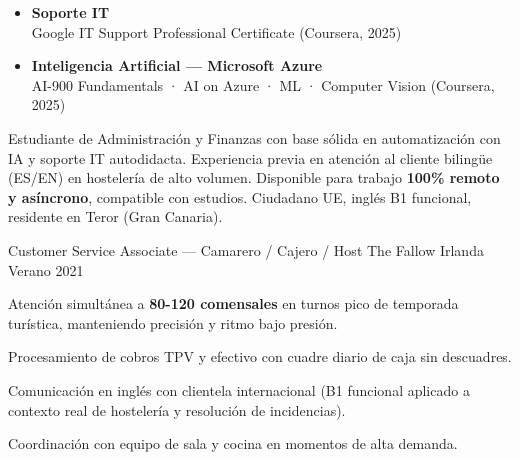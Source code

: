 \documentclass[10pt, a4paper]{awesome-cv}
\begin{document}
\begin{minipage}[t]{0.32\textwidth}
\begin{itemize}[leftmargin=*, label={}, itemsep=4pt]
\item \textbf{Soporte IT}\\{\footnotesize\color{graytext}Google IT Support Professional Certificate (Coursera, 2025) }
\item \textbf{Inteligencia Artificial — Microsoft Azure}\\{\footnotesize\color{graytext}AI-900 Fundamentals · AI on Azure · ML · Computer Vision (Coursera, 2025) }
\end{itemize}


\end{minipage}%
\hfill
\begin{minipage}[t]{0.66\textwidth}
\vspace{0pt}



\begin{cvparagraph}
Estudiante de Administración y Finanzas con base sólida en automatización con IA y soporte IT autodidacta. Experiencia previa en atención al cliente bilingüe (ES/EN) en hostelería de alto volumen. Disponible para trabajo \textbf{100\% remoto y asíncrono}, compatible con estudios. Ciudadano UE, inglés B1 funcional, residente en Teror (Gran Canaria).
\end{cvparagraph}



\begin{cventries}
\cventry
  { Customer Service Associate — Camarero / Cajero / Host }
  { The Fallow }
  { Irlanda }
  { Verano 2021 }
  {
\begin{cvitems}
    \item { Atención simultánea a \textbf{80-120 comensales} en turnos pico de temporada turística, manteniendo precisión y ritmo bajo presión. }
    \item { Procesamiento de cobros TPV y efectivo con cuadre diario de caja sin descuadres. }
    \item { Comunicación en inglés con clientela internacional (B1 funcional aplicado a contexto real de hostelería y resolución de incidencias). }
    \item { Coordinación con equipo de sala y cocina en momentos de alta demanda. }
  \end{cvitems}
  }
\end{cventries}




\end{minipage}
\end{document}
